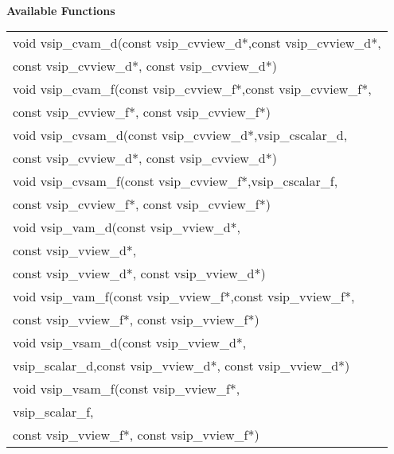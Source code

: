 \\\cvsiplh
\newline \hspace*{.8cm} \vspace*{.1cm} \textbf{Available Functions }
\newline \hspace*{1.1cm} {
\ttfamily
\begin{tabular}[H]{l}
void vsip\_cvam\_d(const vsip\_cvview\_d*,const vsip\_cvview\_d*, \\*\hspace{.7cm}const vsip\_cvview\_d*, const vsip\_cvview\_d*)\\
void vsip\_cvam\_f(const vsip\_cvview\_f*,const vsip\_cvview\_f*, \\*\hspace{.7cm}const vsip\_cvview\_f*, const vsip\_cvview\_f*)\\
void vsip\_cvsam\_d(const vsip\_cvview\_d*,vsip\_cscalar\_d, \\*\hspace{.7cm}const vsip\_cvview\_d*, const vsip\_cvview\_d*)\\
void vsip\_cvsam\_f(const vsip\_cvview\_f*,vsip\_cscalar\_f, \\*\hspace{.7cm}const vsip\_cvview\_f*, const vsip\_cvview\_f*)\\
void vsip\_vam\_d(const vsip\_vview\_d*,\\*\hspace{.7cm}const vsip\_vview\_d*,\\*\hspace{.7cm}const vsip\_vview\_d*, const vsip\_vview\_d*)\\
void vsip\_vam\_f(const vsip\_vview\_f*,const vsip\_vview\_f*,\\*\hspace{.7cm}const vsip\_vview\_f*, const vsip\_vview\_f*)\\
void vsip\_vsam\_d(const vsip\_vview\_d*,\\*\hspace{.7cm}vsip\_scalar\_d,const vsip\_vview\_d*, const vsip\_vview\_d*)\\
void vsip\_vsam\_f(const vsip\_vview\_f*,\\*\hspace{.7cm}vsip\_scalar\_f,\\*\hspace{.7cm}const vsip\_vview\_f*, const vsip\_vview\_f*)\\
\end{tabular}
}
